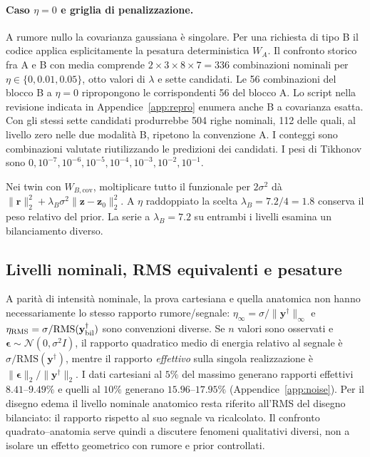 \paragraph{Caso $\eta=0$ e griglia di penalizzazione.}
A rumore nullo la covarianza gaussiana è singolare. Per una richiesta di tipo B il codice applica esplicitamente la pesatura deterministica $W_A$. Il confronto storico fra A e B con media comprende $2\times3\times8\times7=336$ combinazioni nominali per $\eta\in\{0,0.01,0.05\}$, otto valori di $\lambda$ e sette candidati. Le 56 combinazioni del blocco B a $\eta=0$ ripropongono le corrispondenti 56 del blocco A. Lo script nella revisione indicata in Appendice~\ref{app:repro} enumera anche B a covarianza esatta. Con gli stessi sette candidati produrrebbe 504 righe nominali, 112 delle quali, al livello zero nelle due modalità B, ripetono la convenzione A. I conteggi sono combinazioni valutate riutilizzando le predizioni dei candidati. I pesi di Tikhonov sono $0,10^{-7},10^{-6},10^{-5},10^{-4},10^{-3},10^{-2},10^{-1}$.

Nei twin con $W_{B,\mathrm{cov}}$, moltiplicare tutto il funzionale per $2\sigma^2$ dà $\|\mathbf r\|_2^2+\lambda_B\sigma^2\|\mathbf z-\mathbf z_0\|_2^2$. A $\eta$ raddoppiato la scelta $\lambda_B=7.2/4=1.8$ conserva il peso relativo del prior. La serie a $\lambda_B=7.2$ su entrambi i livelli esamina un bilanciamento diverso.

\subsection{Livelli nominali, RMS equivalenti e pesature}
A parità di intensità nominale, la prova cartesiana e quella anatomica non hanno necessariamente lo stesso rapporto rumore/segnale: $\eta_{\infty}=\sigma/\|\mathbf y^\dagger\|_\infty$ e $\eta_{\rm RMS}=\sigma/\mathrm{RMS}(\mathbf y^\dagger_{\rm bil})$ sono convenzioni diverse. Se $n$ valori sono osservati e $\boldsymbol\epsilon\sim\mathcal N(0,\sigma^2I)$, il rapporto quadratico medio di energia relativo al segnale è $\sigma/\mathrm{RMS}(\mathbf y^\dagger)$, mentre il rapporto \emph{effettivo} sulla singola realizzazione è $\|\boldsymbol\epsilon\|_2/\|\mathbf y^\dagger\|_2$. I dati cartesiani al $5\%$ del massimo generano rapporti effettivi $8.41$--$9.49\%$ e quelli al $10\%$ generano $15.96$--$17.95\%$ (Appendice~\ref{app:noise}). Per il disegno edema il livello nominale anatomico resta riferito all'RMS del disegno bilanciato: il rapporto rispetto al suo segnale va ricalcolato. Il confronto quadrato--anatomia serve quindi a discutere fenomeni qualitativi diversi, non a isolare un effetto geometrico con rumore e prior controllati.

